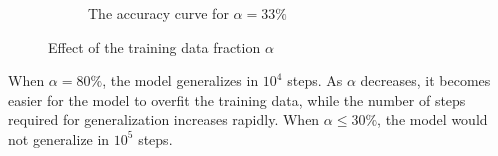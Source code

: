 \begin{figure}[!ht]
\begin{subfigure}[t]{0.3\textwidth}
        \caption{The accuracy curve for $\alpha = 33\%$}
        \label{fig:grokking_alpha_33}
    \end{subfigure}

    \caption{Effect of the training data fraction $\alpha$}
    \label{fig:effect_of_alpha}
\end{figure}

When $\alpha = 80\%$, the model generalizes in $10^4$ steps.
As $\alpha$ decreases, it becomes easier for the model to overfit the training data, while the number of steps required for generalization increases rapidly.
When $\alpha \leq 30\%$, the model would not generalize in $10^5$ steps.
